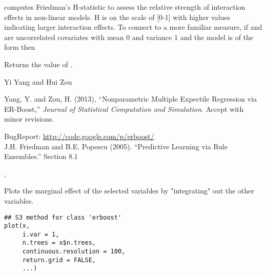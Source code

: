 \documentclass[a4paper]{book}
\begin{document}
%
\begin{Details}\relax
{} computes Friedman's H-statistic to assess the relative
strength of interaction effects in non-linear models. H is on the scale of
[0-1] with higher values indicating larger interaction effects. To connect to
a more familiar measure, if  and  are uncorrelated covariates
with mean 0 and variance 1 and the model is of the form
then
\end{Details}
%
\begin{Value}
Returns the value of .
\end{Value}
%
\begin{Author}\relax
Yi Yang  and Hui Zou 
\end{Author}
%
\begin{References}\relax
Yang, Y. and Zou, H. (2013), ``Nonparametric Multiple Expectile Regression via ER-Boost,'' \emph{Journal of Statistical Computation and Simulation}. Accept with minor revisions.

BugReport: \url{http://code.google.com/p/erboost/}\\{}
J.H. Friedman and B.E. Popescu (2005). ``Predictive Learning via Rule
Ensembles.'' Section 8.1
\end{References}
%
\begin{SeeAlso}\relax
 ,  
\end{SeeAlso}
%
\begin{Description}\relax
Plots the marginal effect of the selected variables by "integrating" out the other variables.
\end{Description}
%
\begin{Usage}
\begin{verbatim}
## S3 method for class 'erboost'
plot(x,
     i.var = 1,
     n.trees = x$n.trees,
     continuous.resolution = 100,
     return.grid = FALSE,
     ...)
\end{verbatim}
\end{Usage}
%
\end{document}
